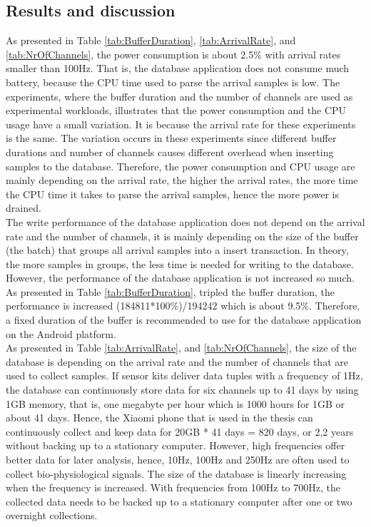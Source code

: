 \subsection{Results and discussion}
As presented in Table \ref{tab:BufferDuration}, \ref{tab:ArrivalRate}, and \ref{tab:NrOfChannels}, the power consumption is about 2.5\% with arrival rates smaller than 100Hz. That is, the database application does not consume much battery, because the CPU time used to parse the arrival samples is low. The experiments, where the buffer duration and the number of channels are used as experimental workloads, illustrates that the power consumption and the CPU usage have a small variation. It is because the arrival rate for these experiments is the same. The variation occurs in these experiments since different buffer durations and number of channels causes different overhead when inserting samples to the database. Therefore, the power consumption and CPU usage are mainly depending on the arrival rate, the higher the arrival rates, the more time the CPU time it takes to parse the arrival samples, hence the more power is drained.\\
The write performance of the database application does not depend on the arrival rate and the number of channels, it is mainly depending on the size of the buffer (the batch) that groups all arrival samples into a insert transaction. In theory, the more samples in groups, the less time is needed for writing to the database. However, the performance of the database application is not increased so much. As presented in Table \ref{tab:BufferDuration}, tripled the buffer duration, the performance is increased (184811*100\%)/194242 which is about 9.5\%. Therefore, a fixed duration of the buffer is recommended to use for the database application on the Android platform.\\
As presented in Table \ref{tab:ArrivalRate}, and \ref{tab:NrOfChannels}, the size of the database is depending on the arrival rate and the number of channels that are used to collect samples. If sensor kits deliver data tuples with a frequency of 1Hz, the database can continuously store data for six channels up to 41 days by using 1GB memory, that is, one megabyte per hour which is 1000 hours for 1GB or about 41 days. Hence, the Xiaomi phone that is used in the thesis can continuously collect and keep data for 20GB * 41 days = 820 days, or 2,2 years without backing up to a stationary computer. However, high frequencies offer better data for later analysis, hence, 10Hz, 100Hz and 250Hz are often used to collect bio-physiological signals. The size of the database is linearly increasing when the frequency is increased. With frequencies from 100Hz to 700Hz, the collected data needs to be backed up to a stationary computer after one or two overnight collections.\\
